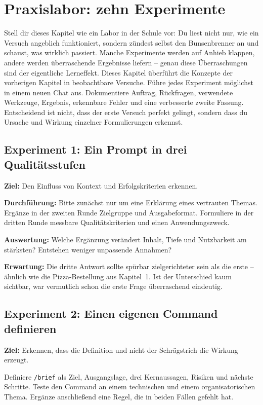 \chapter{Praxislabor: zehn Experimente}

Stell dir dieses Kapitel wie ein Labor in der Schule vor: Du liest nicht nur, wie ein Versuch angeblich funktioniert, sondern zündest selbst den Bunsenbrenner an und schaust, was wirklich passiert. Manche Experimente werden auf Anhieb klappen, andere werden überraschende Ergebnisse liefern -- genau diese Überraschungen sind der eigentliche Lerneffekt. Dieses Kapitel überführt die Konzepte der vorherigen Kapitel in beobachtbare Versuche. Führe jedes Experiment möglichst in einem neuen Chat aus. Dokumentiere Auftrag, Rückfragen, verwendete Werkzeuge, Ergebnis, erkennbare Fehler und eine verbesserte zweite Fassung. Entscheidend ist nicht, dass der erste Versuch perfekt gelingt, sondern dass du Ursache und Wirkung einzelner Formulierungen erkennst.

\section{Experiment 1: Ein Prompt in drei Qualitätsstufen}

\textbf{Ziel:} Den Einfluss von Kontext und Erfolgskriterien erkennen.

\textbf{Durchführung:} Bitte zunächst nur um eine Erklärung eines vertrauten Themas. Ergänze in der zweiten Runde Zielgruppe und Ausgabeformat. Formuliere in der dritten Runde messbare Qualitätskriterien und einen Anwendungszweck.

\textbf{Auswertung:} Welche Ergänzung verändert Inhalt, Tiefe und Nutzbarkeit am stärksten? Entstehen weniger unpassende Annahmen?

\textbf{Erwartung:} Die dritte Antwort sollte spürbar zielgerichteter sein als die erste -- ähnlich wie die Pizza-Bestellung aus Kapitel~1. Ist der Unterschied kaum sichtbar, war vermutlich schon die erste Frage überraschend eindeutig.

\section{Experiment 2: Einen eigenen Command definieren}

\textbf{Ziel:} Erkennen, dass die Definition und nicht der Schrägstrich die Wirkung erzeugt.

Definiere \texttt{/brief} als Ziel, Ausgangslage, drei Kernaussagen, Risiken und nächste Schritte. Teste den Command an einem technischen und einem organisatorischen Thema. Ergänze anschließend eine Regel, die in beiden Fällen gefehlt hat.

